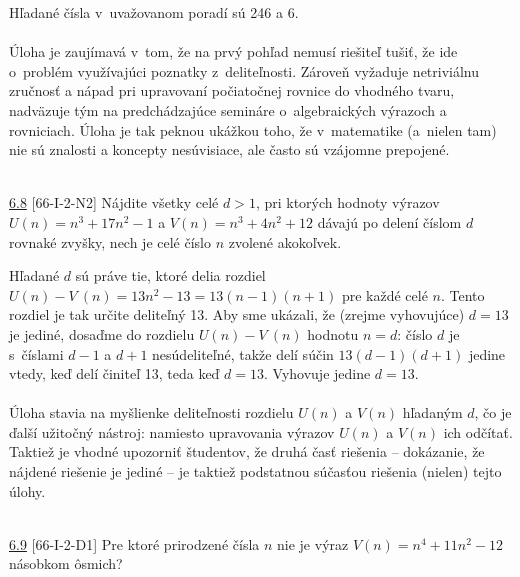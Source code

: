 Hľadané čísla v~uvažovanom poradí sú 246 a 6.\\
\\
\kom Úloha je zaujímavá v~tom, že na prvý pohľad nemusí riešiteľ tušiť, že ide o~problém využívajúci poznatky z~deliteľnosti. Zároveň vyžaduje netriviálnu zručnosť a nápad pri upravovaní počiatočnej rovnice do vhodného tvaru, nadväzuje tým na predchádzajúce semináre o~algebraických výrazoch a rovniciach. Úloha je tak peknou ukážkou toho, že v~matematike (a~nielen tam) nie sú znalosti a koncepty nesúvisiace, ale často sú vzájomne prepojené.\\
\\
\begin{tcolorbox}[breakable,notitle,boxrule=0pt,colback=light-gray,colframe=light-gray]\ul{6.8} [66-I-2-N2] Nájdite všetky celé $d > 1$, pri ktorých hodnoty výrazov $U(n) = n^3+ 17n^2-1$ a $V (n) = n^3+ 4n^2+ 12$ dávajú po delení číslom $d$ rovnaké zvyšky, nech je celé číslo $n$ zvolené akokoľvek.

\end{tcolorbox}

\rieh Hľadané $d$ sú práve tie, ktoré delia rozdiel $U(n) - V~(n) = 13n^2 - 13 = 13(n - 1)(n + 1)$ pre každé celé $n$. Tento rozdiel je tak určite deliteľný 13. Aby sme ukázali, že (zrejme vyhovujúce) $d = 13$ je jediné, dosaďme do rozdielu $U(n) - V~(n)$ hodnotu $n = d$: číslo $d$ je s~číslami $d - 1$ a $d + 1$ nesúdeliteľné, takže delí súčin $13(d - 1)(d + 1)$ jedine vtedy, keď delí činiteľ 13, teda keď $d = 13$. Vyhovuje jedine $d = 13$.\\
\\
\kom Úloha stavia na myšlienke deliteľnosti rozdielu $U(n)$ a $V(n)$ hľadaným $d$, čo je ďalší užitočný nástroj: namiesto upravovania výrazov $U(n)$ a $V(n)$ ich odčítať. Taktiež je vhodné upozorniť študentov, že druhá časť riešenia -- dokázanie, že nájdené riešenie je jediné -- je taktiež podstatnou súčasťou riešenia (nielen) tejto úlohy.\\
\\
\begin{tcolorbox}[breakable,notitle,boxrule=0pt,colback=light-gray,colframe=light-gray]\ul{6.9} [66-I-2-D1] Pre ktoré prirodzené čísla $n$ nie je výraz $V (n) = n^4+ 11n^2 - 12$ násobkom ôsmich?

\end{tcolorbox}

